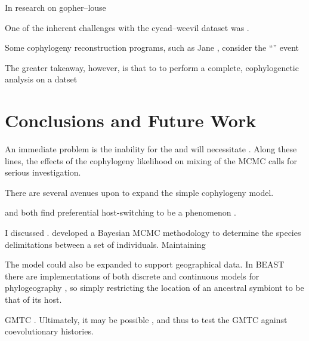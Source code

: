 \documentclass[12pt,letterpaper]{article}
\begin{document}
In research on gopher--louse

One of the inherent challenges with the cycad--weevil dataset was . 

Some cophylogeny reconstruction programs, such as Jane \parencite{Conow:2010}, consider the \enquote{} event

The greater takeaway, however, is that to to perform a complete, cophylogenetic analysis on a datset

\section*{Conclusions and Future Work}

An immediate problem is the inability for the and will necessitate . Along these lines, the effects of the cophylogeny likelihood on mixing of the \ac{MCMC} calls for serious investigation. 

There are several avenues upon to expand the simple cophylogeny model. 

\textcite{Charleston:2002} and \textcite{Faria:2013} both find preferential host-switching to be a phenomenon . 

I discussed . \textcite{Yang:2010} developed a Bayesian \ac{MCMC} methodology to determine the species delimitations between a set of individuals. Maintaining 

The model could also be expanded to support geographical data. In BEAST there are implementations of both discrete and continuous models for phylogeography \parencites{Lemey:2009}{Lemey:2010}, so simply restricting the location of an ancestral symbiont to be that of its host.

\ac{GMTC} . Ultimately, it may be possible , and thus to test the \ac{GMTC} against coevolutionary histories.

\printbibliography
\end{document}
